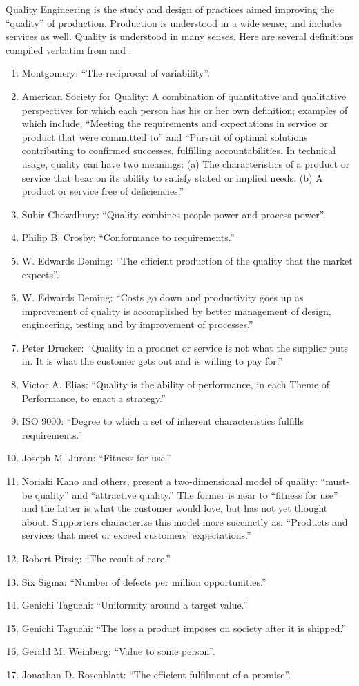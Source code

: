 \documentclass[12pt,a4paper]{report}
\theoremstyle{plain}
\theoremstyle{definition}
\begin{document}
Quality Engineering is the study and design of practices aimed improving the ``quality'' of production. 
Production is understood in a wide sense, and includes services as well.
Quality is understood in many senses. Here are several definitions compiled verbatim from \cite{montgomery_introduction_2007}  and \cite{wikipedia_quality_2015}:
\begin{enumerate}
\item Montgomery: ``The reciprocal of variability''.
\item American Society for Quality:
A combination of quantitative and qualitative perspectives for which each person has his or her own definition; examples of which include, ``Meeting the requirements and expectations in service or product that were committed to'' and ``Pursuit of optimal solutions contributing to confirmed successes, fulfilling accountabilities.
 In technical usage, quality can have two meanings: 
 (a) The characteristics of a product or service that bear on its ability to satisfy stated or implied needs. 
 (b) A product or service free of deficiencies.''
\item Subir Chowdhury: 
``Quality combines people power and process power''.
\item Philip B. Crosby: 
``Conformance to requirements.''
\item  W. Edwards Deming:
``The efficient production of the quality that the market expects''.
\item W. Edwards Deming: 
``Costs go down and productivity goes up as improvement of quality is accomplished by better management of design, engineering, testing and by improvement of processes.''
\item Peter Drucker: 
``Quality in a product or service is not what the supplier puts in. It is what the customer gets out and is willing to pay for.''
\item Victor A. Elias: 
``Quality is the ability of performance, in each Theme of Performance, to enact a strategy.''
\item ISO 9000: 
``Degree to which a set of inherent characteristics fulfills requirements.'' 
\item Joseph M. Juran: 
``Fitness for use.''. 
\item Noriaki Kano and others, present a two-dimensional model of quality: ``must-be quality'' and ``attractive quality.'' The former is near to ``fitness for use'' and the latter is what the customer would love, but has not yet thought about. Supporters characterize this model more succinctly as: ``Products and services that meet or exceed customers' expectations.''
\item Robert Pirsig: ``The result of care.''
\item Six Sigma: ``Number of defects per million opportunities.''
\item Genichi Taguchi:
``Uniformity around a target value.''
\item Genichi Taguchi:
``The loss a product imposes on society after it is shipped.''
\item Gerald M. Weinberg: ``Value to some person''.
\item Jonathan D. Rosenblatt: ``The efficient fulfilment of a promise''.
\end{enumerate}
\end{document}

